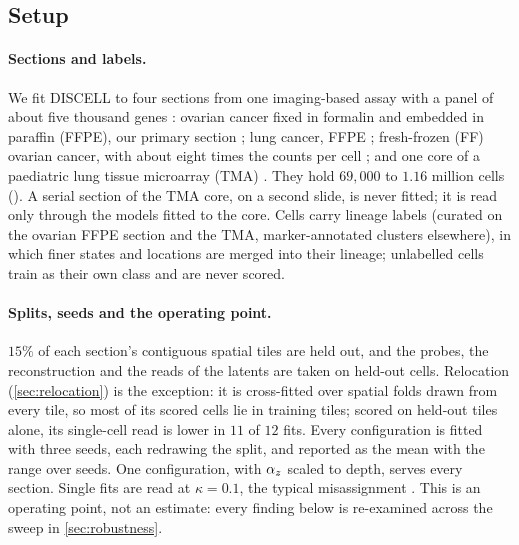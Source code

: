 \subsection{Setup}
\label{sec:setup}

\paragraph{Sections and labels.}
We fit DISCELL to four sections from one imaging-based assay with a panel of about five thousand genes \citep{janesick2023}: ovarian cancer fixed in formalin and embedded in paraffin (FFPE), our primary section \citep{tenx_ovarian_ffpe}; lung cancer, FFPE \citep{tenx_lung_ffpe}; fresh-frozen (FF) ovarian cancer, with about eight times the counts per cell \citep{tenx_ovary_ff}; and one core of a paediatric lung tissue microarray (TMA) \citep{williamskatek2026fishing}. They hold $69{,}000$ to $1.16$ million cells (). A serial section of the TMA core, on a second slide, is never fitted; it is read only through the models fitted to the core. Cells carry lineage labels (curated on the ovarian FFPE section and the TMA, marker-annotated clusters elsewhere), in which finer states and locations are merged into their lineage; unlabelled cells train as their own class and are never scored.

\paragraph{Splits, seeds and the operating point.}
$15\%$ of each section's contiguous spatial tiles are held out, and the probes, the reconstruction and the reads of the latents are taken on held-out cells. Relocation (\cref{sec:relocation}) is the exception: it is cross-fitted over spatial folds drawn from every tile, so most of its scored cells lie in training tiles; scored on held-out tiles alone, its single-cell read is lower in $11$ of $12$ fits. Every configuration is fitted with three seeds, each redrawing the split, and reported as the mean with the range over seeds. One configuration, with $\alpha_z$ scaled to depth, serves every section. Single fits are read at $\kappa = 0.1$, the typical misassignment \citep{yang2025mistic}. This is an operating point, not an estimate: every finding below is re-examined across the sweep in \cref{sec:robustness}.

